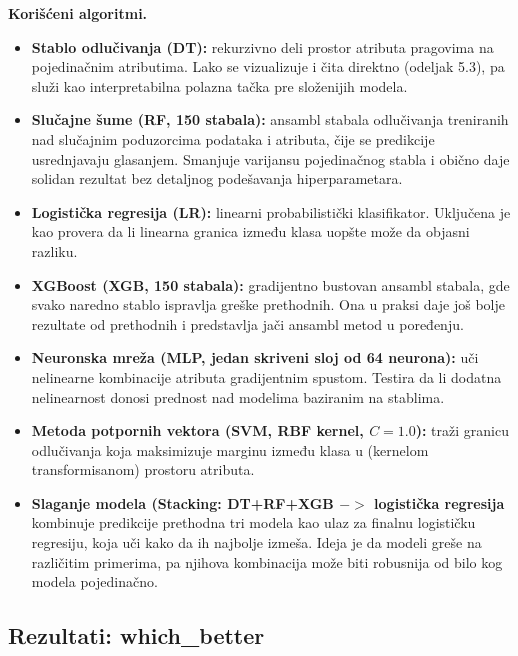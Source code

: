 \documentclass[12pt, a4paper]{article}
\begin{document}
\textbf{Korišćeni algoritmi.}
\begin{itemize}[noitemsep]
    \item \textbf{Stablo odlučivanja (DT):} rekurzivno deli prostor atributa pragovima na
    pojedinačnim atributima. Lako se vizualizuje i čita direktno (odeljak 5.3), pa služi kao
    interpretabilna polazna tačka pre složenijih modela.
    \item \textbf{Slučajne šume (RF, 150 stabala):} ansambl stabala odlučivanja treniranih
    nad slučajnim poduzorcima podataka i atributa, čije se predikcije usrednjavaju
    glasanjem. Smanjuje varijansu pojedinačnog stabla i obično daje solidan rezultat bez
    detaljnog podešavanja hiperparametara.
    \item \textbf{Logistička regresija (LR):} linearni probabilistički klasifikator.
    Uključena je kao provera da li linearna granica između klasa uopšte može da objasni
    razliku.
    \item \textbf{XGBoost (XGB, 150 stabala):} gradijentno bustovan ansambl stabala, gde
    svako naredno stablo ispravlja greške prethodnih. Ona u praksi daje još bolje rezultate od prethodnih i predstavlja jači ansambl metod u poređenju.
    \item \textbf{Neuronska mreža (MLP, jedan skriveni sloj od 64 neurona):} uči nelinearne
    kombinacije atributa gradijentnim spustom. Testira da li dodatna nelinearnost donosi
    prednost nad modelima baziranim na stablima.
    \item \textbf{Metoda potpornih vektora (SVM, RBF kernel, $C{=}1.0$):} traži granicu
    odlučivanja koja maksimizuje marginu između klasa u (kernelom transformisanom) prostoru
    atributa.
    \item \textbf{Slaganje modela (Stacking: DT+RF+XGB $->$ logistička regresija} kombinuje predikcije prethodna tri modela kao ulaz za finalnu logističku
    regresiju, koja uči kako da ih najbolje izmeša. Ideja je da modeli greše na različitim
    primerima, pa njihova kombinacija može biti robusnija od bilo kog modela pojedinačno.
\end{itemize}

\subsection{Rezultati: which\_better}
\end{document}
